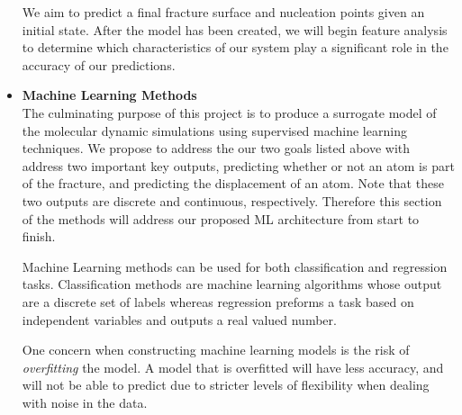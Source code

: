 \begin{itemize}
 We aim to predict a final fracture surface and nucleation points given an initial state. After the model has been created, we will begin feature analysis to determine which characteristics of our system play a significant role in the accuracy of our predictions.
\\

\item \textbf{Machine Learning Methods}
\bigskip
\\
The culminating purpose of this project is to produce a surrogate model of the molecular dynamic simulations using supervised machine learning techniques. We propose to address the our two goals listed above with address two important key outputs, predicting whether or not an atom is part of the fracture, and predicting the displacement of an atom. Note that these two outputs are discrete and continuous, respectively. Therefore this section of the methods will address our proposed ML architecture from start to finish.  

Machine Learning methods can be used for both classification and regression tasks. Classification methods are machine learning algorithms whose output are a discrete set of labels whereas regression preforms a task based on independent variables and outputs a real valued number. 

One concern when constructing machine learning models is the risk of \textit{overfitting} the model. A model that is overfitted will have less accuracy, and will not be able to predict due to stricter levels of flexibility when dealing with noise in the data. 





\end{itemize}
